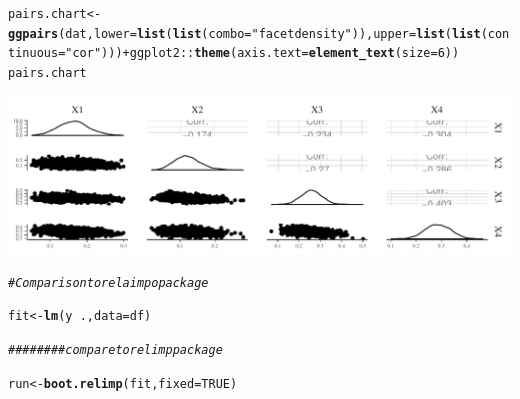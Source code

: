 \documentclass[11pt,a4paper,twoside]{book}\usepackage[]{graphicx}\usepackage[]{color}
\makeatletter
\newcommand{\hlnum}[1]{\textcolor[rgb]{0.686,0.059,0.569}{#1}}%
\newcommand{\hlstr}[1]{\textcolor[rgb]{0.192,0.494,0.8}{#1}}%
\newcommand{\hlcom}[1]{\textcolor[rgb]{0.678,0.584,0.686}{\textit{#1}}}%
\newcommand{\hlopt}[1]{\textcolor[rgb]{0,0,0}{#1}}%
\newcommand{\hlstd}[1]{\textcolor[rgb]{0.345,0.345,0.345}{#1}}%
\newcommand{\hlkwb}[1]{\textcolor[rgb]{0.69,0.353,0.396}{#1}}%
\newcommand{\hlkwc}[1]{\textcolor[rgb]{0.333,0.667,0.333}{#1}}%
\newcommand{\hlkwd}[1]{\textcolor[rgb]{0.737,0.353,0.396}{\textbf{#1}}}%
\newenvironment{kframe}{%
 \def\at@end@of@kframe{}%
 \ifinner\ifhmode%
  \def\at@end@of@kframe{\end{minipage}}%
  \begin{minipage}{\columnwidth}%
 \fi\fi%
 \def\FrameCommand##1{\hskip\@totalleftmargin \hskip-\fboxsep
 \colorbox{shadecolor}{##1}\hskip-\fboxsep
     \hskip-\linewidth \hskip-\@totalleftmargin \hskip\columnwidth}%
 \MakeFramed {\advance\hsize-\width
   \@totalleftmargin\z@ \linewidth\hsize
   \@setminipage}}%
 {\par\unskip\endMakeFramed%
 \at@end@of@kframe}
\newenvironment{knitrout}{}{} %
\makeatother
\begin{document}
\begin{knitrout}
\begin{kframe}
\begin{alltt}
\hlstd{pairs.chart} \hlkwb{<-} \hlkwd{ggpairs}\hlstd{(dat,} \hlkwc{lower} \hlstd{=} \hlkwd{list}\hlstd{(}\hlkwd{list}\hlstd{(}\hlkwc{combo} \hlstd{=} \hlstr{"facetdensity"}\hlstd{)),} \hlkwc{upper} \hlstd{=} \hlkwd{list}\hlstd{(}\hlkwd{list}\hlstd{(}\hlkwc{continuous} \hlstd{=} \hlstr{"cor"}\hlstd{)))} \hlopt{+} \hlstd{ggplot2}\hlopt{::}\hlkwd{theme}\hlstd{(}\hlkwc{axis.text} \hlstd{=} \hlkwd{element_text}\hlstd{(}\hlkwc{size} \hlstd{=} \hlnum{6}\hlstd{))}
\hlstd{pairs.chart}
\end{alltt}
\end{kframe}

{\centering \includegraphics[width=\textwidth-3cm]{figure/ch03_figsimdata_LMG-1} 

}


\begin{kframe}\begin{alltt}
\hlcom{# Comparison to relaimpo package}

\hlstd{fit} \hlkwb{<-} \hlkwd{lm}\hlstd{(y}\hlopt{~}\hlstd{.,} \hlkwc{data}\hlstd{=df)}

\hlcom{######## compare to relimp package}

\hlstd{run}\hlkwb{<-}\hlkwd{boot.relimp}\hlstd{(fit,} \hlkwc{fixed}\hlstd{=}\hlnum{TRUE}\hlstd{)}


\end{alltt}
\end{kframe}
\end{knitrout}
\end{document}
